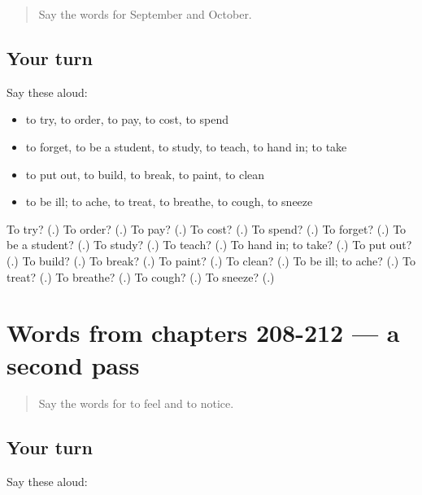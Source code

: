 \begin{quote}
Say the words for September and October.
\end{quote}

\subsection*{Your turn}
Say these aloud:

\begin{itemize}
\raggedright
  \item to try, to order, to pay, to cost, to spend
  \item to forget, to be a student, to study, to teach, to hand in; to take
  \item to put out, to build, to break, to paint, to clean
  \item to be ill; to ache, to treat, to breathe, to cough, to sneeze
\end{itemize}

\begin{tcolorbox}[breakable,colback=teal!4,colframe=teal!35!black,title={Before you move on}]
To try? (\textbf{}.) To order? (\textbf{}.) To pay? (\textbf{}.) To cost? (\textbf{}.) To spend? (\textbf{}.) To forget? (\textbf{}.) To be a student? (\textbf{}.) To study? (\textbf{}.) To teach? (\textbf{}.) To hand in; to take? (\textbf{}.) To put out? (\textbf{}.) To build? (\textbf{}.) To break? (\textbf{}.) To paint? (\textbf{}.) To clean? (\textbf{}.) To be ill; to ache? (\textbf{}.) To treat? (\textbf{}.) To breathe? (\textbf{}.) To cough? (\textbf{}.) To sneeze? (\textbf{}.)
\end{tcolorbox}
\section[(dialogue)]{Words from chapters 208-212 — a second pass}

\label{lesson:RU-R212-second-pass-words-from-chapters-208-212}



\begin{quote}
Say the words for to feel and to notice.
\end{quote}

\subsection*{Your turn}
Say these aloud:

